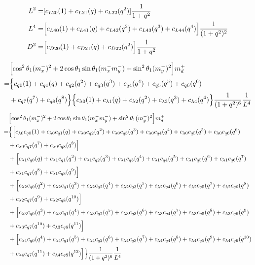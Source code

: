 \documentclass[12pt]{article}
\begin{document}
\begin{align}
    L^2 =& [ c_{L20}(1) + c_{L21}(q)  + c_{L22}(q^2)]\frac{1}{1+q^2}\\
    L^4 =&  \Bigl[ c_{L40}(1) +  c_{L41}(q) + c_{L42}(q^2) + c_{L43}(q^3) + c_{L44}(q^4) \Bigr]\frac{1}{(1+q^2)^2}\\
    D^2 =& \Bigl[ c_{D20}(1) + c_{D21}(q) + c_{D22}(q^2)\Bigr]\frac{1}{1+q^2}
\end{align}

\begin{align}
    &\Bigl[\cos^2\theta_1(m_x^-)^2 + 2\cos\theta_1\sin\theta_1 (m_x^-m_y^-)  + \sin^2\theta_1(m_y^-)^2 \Bigr] m_d^+ \\
    =& \Bigl\{
    c_{q0}(1) + c_{q1}(q) + c_{q2}(q^2) + c_{q3}(q^3) + c_{q4}(q^4) + c_{q5}(q^5) + c_{q6}(q^6) \nonumber\\
    &+ c_{q7}(q^7) + c_{q8}(q^8)
    \Bigr\}\Bigl\{ c_{\lambda0}(1) + c_{\lambda1}(q) +c_{\lambda2}(q^2) +c_{\lambda3}(q^3) +c_{\lambda4}(q^4)
    \Bigr\}\frac{1}{(1+q^2)^6}\frac{1}{L^4}
\end{align}
\begin{align}
    &\Bigl[\cos^2\theta_1(m_x^-)^2 + 2\cos\theta_1\sin\theta_1 (m_x^-m_y^-)  + \sin^2\theta_1(m_y^-)^2 \Bigr] m_d^+ \\
    =& \Bigl\{ \Bigl[ c_{\lambda0}c_{q0}(1) + c_{\lambda0}c_{q1}(q) + c_{\lambda0}c_{q2}(q^2) + c_{\lambda0}c_{q3}(q^3) + c_{\lambda0}c_{q4}(q^4) + c_{\lambda0}c_{q5}(q^5) + c_{\lambda0}c_{q6}(q^6) \nonumber\\
    &+ c_{\lambda0}c_{q7}(q^7) + c_{\lambda0}c_{q8}(q^8)
    \Bigr]\nonumber\\
    &+ \Bigl[ c_{\lambda1}c_{q0}(q) + c_{\lambda1}c_{q1}(q^2) + c_{\lambda1}c_{q2}(q^3) + c_{\lambda1}c_{q3}(q^4) + c_{\lambda1}c_{q4}(q^5) + c_{\lambda1}c_{q5}(q^6) + c_{\lambda1}c_{q6}(q^7) \nonumber\\
    &+ c_{\lambda1}c_{q7}(q^8) + c_{\lambda1}c_{q8}(q^9)
    \Bigr]\nonumber\\
    &+ \Bigl[ c_{\lambda2}c_{q0}(q^2) + c_{\lambda2}c_{q1}(q^3) + c_{\lambda2}c_{q2}(q^4) + c_{\lambda2}c_{q3}(q^5) + c_{\lambda2}c_{q4}(q^6) + c_{\lambda2}c_{q5}(q^7) + c_{\lambda2}c_{q6}(q^8) \nonumber\\
    &+ c_{\lambda2}c_{q7}(q^9) + c_{\lambda2}c_{q8}(q^{10})
    \Bigr]\nonumber\\
    &+ \Bigl[ c_{\lambda3}c_{q0}(q^3) + c_{\lambda3}c_{q1}(q^4) + c_{\lambda3}c_{q2}(q^5) + c_{\lambda3}c_{q3}(q^6) + c_{\lambda3}c_{q4}(q^7) + c_{\lambda3}c_{q5}(q^8) + c_{\lambda3}c_{q6}(q^9) \nonumber\\
    &+ c_{\lambda3}c_{q7}(q^{10}) + c_{\lambda3}c_{q8}(q^{11})
    \Bigr]\nonumber\\
    &+ \Bigl[ c_{\lambda4}c_{q0}(q^4) + c_{\lambda4}c_{q1}(q^5) + c_{\lambda4}c_{q2}(q^6) + c_{\lambda4}c_{q3}(q^7) + c_{\lambda4}c_{q4}(q^8) + c_{\lambda4}c_{q5}(q^9) + c_{\lambda4}c_{q6}(q^{10}) \nonumber\\
    &+ c_{\lambda4}c_{q7}(q^{11}) + c_{\lambda4}c_{q8}(q^{12}) \Bigr]
    \Bigr\}\frac{1}{(1+q^2)^6}\frac{1}{L^4}
\end{align}
\end{document}
